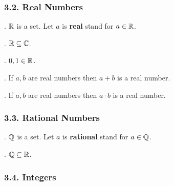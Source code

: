 \subsubsection{3.2. Real Numbers}

\begin{signature}.
${\Bbb R}$ is a set. Let $a$ is {\bf real} stand for $a \in {\Bbb R}$.
\end{signature}

\begin{axiom}.
${\Bbb R} \subseteq {\Bbb C}$.
\end{axiom}



\begin{axiom}.
$0,1 \in {\Bbb R}$.
\end{axiom}

\begin{axiom}.
If $a,b$ are real numbers then $a+b$ is a real number.
\end{axiom}

\begin{axiom}.
If $a,b$ are real numbers then $a \cdot b$ is a real number.
\end{axiom}

\subsubsection{3.3. Rational Numbers}

\begin{signature}.
${\Bbb Q}$ is a set. Let $a$ is {\bf rational} stand for $a \in {\Bbb Q}$.
\end{signature}

\begin{axiom}.
${\Bbb Q} \subseteq {\Bbb R}$.
\end{axiom}

\subsubsection{3.4. Integers}

